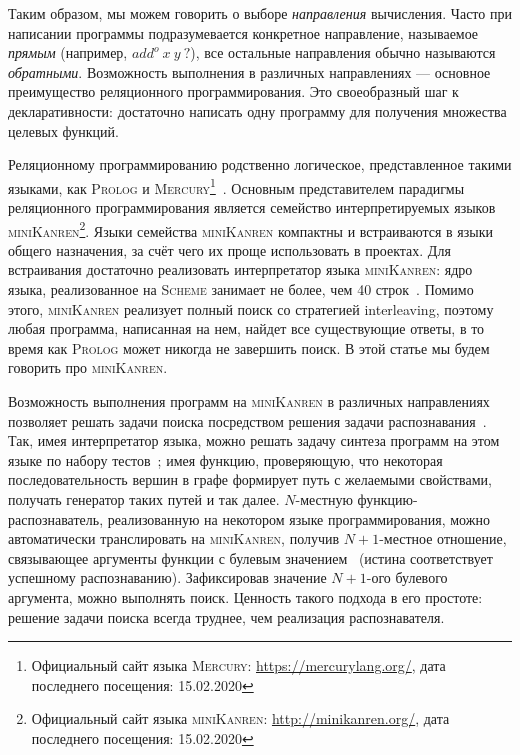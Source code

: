 \documentclass[conference,a4paper,american,russian]{IEEEtran}
\newcommand{\miniKanren}{\textsc{miniKanren}}
\newcommand{\mercury}{\textsc{Mercury}}
\newcommand{\prolog}{\textsc{Prolog}}
\newcommand{\scheme}{\textsc{Scheme}}
\begin{document}
Таким образом, мы можем говорить о выборе \textit{направления} вычисления. 
Часто при написании программы подразумевается конкретное направление, называемое \textit{прямым} (например, $add^o  \ x \ y \ ?$), все остальные направления обычно называются \textit{обратными}. 
Возможность выполнения в различных направлениях --- основное преимущество реляционного программирования. 
Это своеобразный шаг к декларативности: достаточно написать одну программу для получения множества целевых функций. 

Реляционному программированию родственно логическое, представленное такими языками, как \prolog{} и \mercury{}\footnote{Официальный сайт языка \mercury{}: \url{https://mercurylang.org/}, дата последнего посещения: 15.02.2020}~\cite{SOMOGYI199617}.
Основным представителем парадигмы реляционного программирования является семейство интерпретируемых языков \miniKanren{}\footnote{Официальный сайт языка \miniKanren{}: \url{http://minikanren.org/}, дата последнего посещения: 15.02.2020}.
Языки семейства \miniKanren{} компактны и встраиваются в языки общего назначения, за счёт чего их проще использовать в  проектах. 
Для встраивания достаточно реализовать интерпретатор языка \miniKanren{}: ядро языка, реализованное на \scheme{} занимает не более, чем 40 строк~\cite{hemann2013ukanren}.
Помимо этого, \miniKanren{} реализует полный поиск со стратегией interleaving, поэтому любая программа, написанная на нем, найдет все существующие ответы, в то время как \prolog{} может никогда не завершить поиск. 
В этой статье мы будем говорить про \miniKanren{}.

Возможность выполнения программ на \miniKanren{} в различных направлениях позволяет решать задачи поиска посредством решения задачи распознавания~\cite{lozov2019relational}.
Так, имея интерпретатор языка, можно решать задачу синтеза программ на этом языке по набору тестов~\cite{byrd2017unified}; имея функцию, проверяющую, что некоторая последовательность вершин в графе формирует путь с желаемыми свойствами, получать генератор таких путей и так далее. 
$N$-местную функцию-распознаватель, реализованную на некотором языке программирования, можно автоматически транслировать на \miniKanren{}, получив $N+1$-местное отношение, связывающее аргументы функции с булевым значением~\cite{lozov2019relational} (истина соответствует успешному распознаванию). 
Зафиксировав значение $N+1$-ого булевого аргумента, можно выполнять поиск. 
Ценность такого подхода в его простоте: решение задачи поиска всегда труднее, чем реализация распознавателя. 
\end{document}
